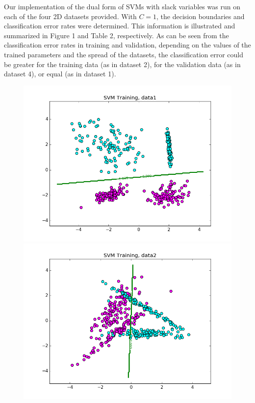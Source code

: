 \documentclass{article}
\begin{document}
Our implementation of the dual form of SVMs with slack variables was run on each of the four 2D datasets provided. With $C=1$, the decision boundaries and classification error rates were determined. This information is illustrated and summarized in Figure 1 and Table 2, respectively. As can be seen from the classification error rates in training and validation, depending on the values of the trained parameters and the spread of the datasets, the classification error could be greater for the training data (as in dataset 2), for the validation data (as in dataset 4), or equal (as in dataset 1).
\begin{figure}[width=\linewidth]
\centering
\begin{multicols}{2}
  \includegraphics[width=1.2\linewidth]{code/P2/data1,training.png}
  \includegraphics[width=1.2\linewidth]{code/P2/data2,training.png}

\end{multicols}
\end{figure}
\end{document}
